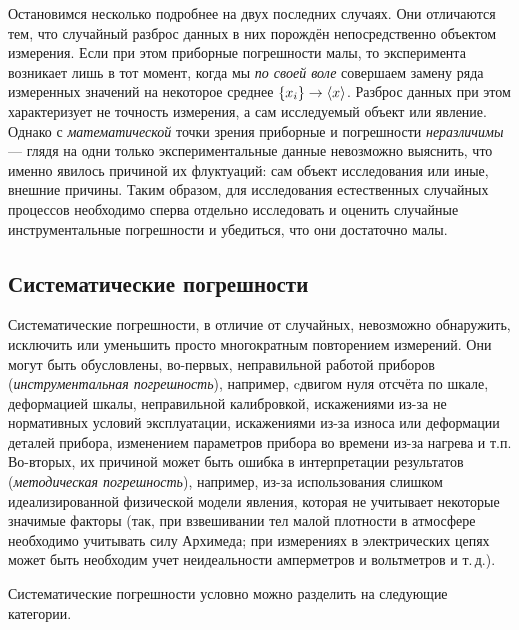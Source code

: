 Остановимся несколько подробнее на двух последних случаях. Они отличаются
тем, что случайный разброс данных в них порождён непосредственно объектом
измерения. Если при этом приборные погрешности малы, то 
эксперимента возникает лишь в тот момент, когда мы \emph{по своей
воле} совершаем замену ряда измеренных значений на некоторое среднее
$\left\{ x_{i}\right\} \to\left<x\right>$. Разброс данных при этом
характеризует не точность измерения, а сам исследуемый объект или
явление. Однако с \emph{математической} точки зрения приборные и
погрешности \emph{неразличимы} --- глядя на одни только
экспериментальные данные невозможно выяснить, что именно явилось причиной
их флуктуаций: сам объект исследования или иные, внешние причины.
Таким образом, для исследования естественных случайных процессов необходимо
сперва отдельно исследовать и оценить случайные инструментальные погрешности
и убедиться, что они достаточно малы.


\subsection{Систематические погрешности}

Систематические погрешности, в отличие от случайных, невозможно обнаружить,
исключить или уменьшить просто многократным повторением измерений.
Они могут быть обусловлены, во-первых, неправильной работой приборов
(\emph{инструментальная погрешность}), например, cдвигом нуля отсчёта
по шкале, деформацией шкалы, неправильной калибровкой, искажениями
из-за не нормативных условий эксплуатации, искажениями из-за износа
или деформации деталей прибора, изменением параметров прибора во времени
из-за нагрева и т.п. Во-вторых, их причиной может быть ошибка в интерпретации
результатов (\emph{методическая погрешность}), например, из-за использования
слишком идеализированной физической модели явления, которая не учитывает
некоторые значимые факторы (так, при взвешивании тел малой плотности
в атмосфере необходимо учитывать силу Архимеда; при измерениях в электрических
цепях может быть необходим учет неидеальности амперметров и вольтметров
и т.\,д.).

Систематические погрешности условно можно разделить на следующие категории.

